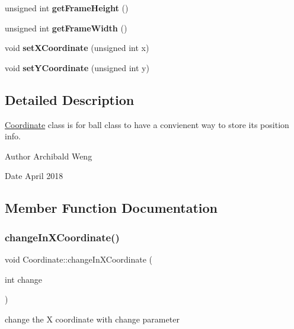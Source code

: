 \begin{DoxyCompactItemize}
unsigned int {\bfseries get\+Frame\+Height} ()
\item 
\mbox{\label{class_coordinate_a84058b1cc290474a88411afb16986444}} 
unsigned int {\bfseries get\+Frame\+Width} ()
\item 
\mbox{\label{class_coordinate_a91fed770c781d4aaa493d3f44128e667}} 
void {\bfseries set\+X\+Coordinate} (unsigned int x)
\item 
\mbox{\label{class_coordinate_aea0d21e00aab864c4f0a2bbd6569a86e}} 
void {\bfseries set\+Y\+Coordinate} (unsigned int y)
\end{DoxyCompactItemize}


\subsection{Detailed Description}
\mbox{\hyperlink{class_coordinate}{Coordinate}} class is for ball class to have a convienent way to store its position info. 

\begin{DoxyAuthor}{Author}
Archibald Weng 
\end{DoxyAuthor}
\begin{DoxyDate}{Date}
April 2018 
\end{DoxyDate}


\subsection{Member Function Documentation}
\mbox{\label{class_coordinate_a8481ba6f79f9b7f6ac41a28119d251b9}} 
\subsubsection{\texorpdfstring{change\+In\+X\+Coordinate()}{changeInXCoordinate()}}
{\footnotesize\ttfamily void Coordinate\+::change\+In\+X\+Coordinate (\begin{DoxyParamCaption}\item[{int}]{change }\end{DoxyParamCaption})}

change the X coordinate with \textquotesingle{}change\textquotesingle{} parameter \mbox{\label{class_coordinate_ad2cd26113f8101771bea445fb5dc907f}} 
